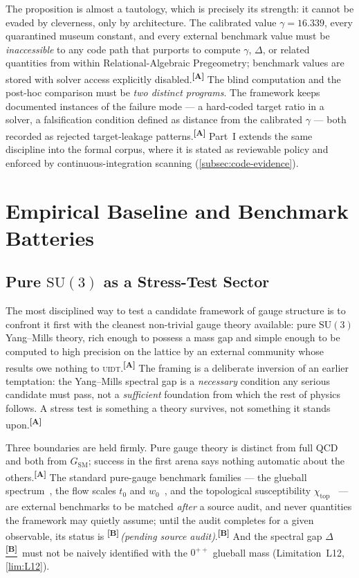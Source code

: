 \documentclass[12pt,a4paper,twoside]{article}
\theoremstyle{plain}
\theoremstyle{definition}
\theoremstyle{remark}
\newcommand{\ProjectShort}{Relational-Algebraic Pregeometry}
\newcommand{\RAP}{\ProjectShort}
\newcommand{\UIDT}{\textsc{uidt}} %
\newcommand{\catmark}[1]{\textsuperscript{\textsf{\textbf{[#1]}}}}
\newcommand{\Bdelta}{\hyperref[box:pi-override-delta]{\catmark{B}}}
\newcommand{\Bpending}{\catmark{B}\,\textit{(pending source audit)}}
\begin{document}
\noindent The proposition is almost a tautology, which is precisely its
strength: it cannot be evaded by cleverness, only by architecture. The
calibrated value $\gamma = 16.339$, every quarantined museum constant,
and every external benchmark value must be \emph{inaccessible} to any
code path that purports to compute $\gamma$, $\Delta$, or related
quantities from within \RAP; benchmark values are stored with solver
access explicitly disabled.\catmark{A} The blind computation and the
post-hoc comparison must be \emph{two distinct programs}. The framework
keeps documented instances of the failure mode --- a hard-coded target
ratio in a solver, a falsification condition defined as distance from
the calibrated $\gamma$ --- both recorded as rejected target-leakage
patterns.\catmark{A} Part~I extends the same discipline into the formal
corpus, where it is stated as reviewable policy and enforced by
continuous-integration scanning (\cref{subsec:code-evidence}).

\section{Empirical Baseline and Benchmark Batteries}
\label{sec:benchmark-batteries}

\subsection{Pure \texorpdfstring{$\mathrm{SU}(3)$}{SU(3)} as a Stress-Test Sector}
\label{subsec:su3-stress-test}

The most disciplined way to test a candidate framework of gauge
structure is to confront it first with the cleanest non-trivial gauge
theory available: pure $\mathrm{SU}(3)$ Yang--Mills theory, rich enough
to possess a mass gap and simple enough to be computed to high precision
on the lattice by an external community whose results owe nothing to
\UIDT.\catmark{A} The framing is a deliberate inversion of an earlier
temptation: the Yang--Mills spectral gap is a \emph{necessary} condition
any serious candidate must pass, not a \emph{sufficient} foundation from
which the rest of physics follows. A stress test is something a theory
survives, not something it stands upon.\catmark{A}

Three boundaries are held firmly. Pure gauge theory is distinct from
full QCD and both from $G_{\mathrm{SM}}$; success in the first arena
says nothing automatic about the others.\catmark{A} The standard
pure-gauge benchmark families --- the glueball spectrum~\cite{morningstar1999,michael1989,athenodorou2020,athenodorou2021}, the flow scales
$t_0$ and $w_0$~\cite{luscher2010}, and the topological susceptibility
$\chi_{\mathrm{top}}$~\cite{durr2007} --- are external benchmarks to be matched
\emph{after} a source audit, and never quantities the framework may
quietly assume; until the audit completes for a given observable, its
status is \Bpending.\catmark{B} And the spectral gap $\Delta$\,\Bdelta\
must not be naively identified with the $0^{++}$ glueball mass
(Limitation~L12, \cref{lim:L12}).
\end{document}

